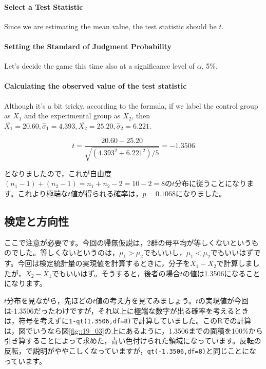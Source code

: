 \documentclass{ltjsbook}
\begin{document}
\paragraph{Select a Test Statistic} Since we are estimating the mean value, the test statistic should be $t$.
\paragraph{Setting the Standard of Judgment Probability} Let's decide the game this time also at a significance level of $\alpha$, 5\%.
\paragraph{Calculating the observed value of the test statistic} Although it's a bit tricky, according to the formula, if we label the control group as $X_1$ and the experimental group as $X_2$, then $\bar{X_1}=20.60,\hat{\sigma}_1=4.393,\bar{X_2}=25.20,\hat{\sigma}_2=6.221$.

\[ t = \frac{20.60-25.20}{\sqrt{(4.393^2+6.221^2)/5}} = -1.3506\]

となりましたので，これが自由度$(n_1-1)+(n_2-1)=n_1+n_2-2=10-2=8$の$t$分布に従うことになります。これより極端な$t$値が得られる確率は，$p=0.1068$になりました。
\subsection{検定と方向性}
ここで注意が必要です。今回の帰無仮説は，2群の母平均が等しくないというものでした。等しくないというのは，$\mu_1>\mu_2$でもいいし，$\mu_1<\mu_2$でもいいはずです。今回は検定統計量の実現値を計算するときに，分子を$\bar{X_1}-\bar{X_2}$で計算しましたが，$\bar{X_2}-\bar{X_1}$でもいいはず。そうすると，後者の場合$t$の値は1.3506になることになります。

$t$分布を見ながら，先ほどの$t$値の考え方を見てみましょう。$t$の実現値が今回は-1.3506だったわけですが，それ以上に極端な数字が出る確率を考えるときは，符号を考えずに\texttt{1-qt(1.3506,df=8)}で計算していました。このRでの計算は，図でいうなら図\ref{fig::19_03}の上にあるように，1.3506までの面積を100\%から引き算することによって求めた，青い色付けられた領域になっています。反転の反転，で説明がややこしくなっていますが，\texttt{qt(-1.3506,df=8)}と同じことになっています。
\end{document}
